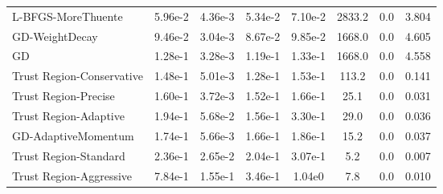 \documentclass{article}
\begin{document}
\begin{table}[htbp]
{\begin{tabular}{p{2.5cm}*{7}{c}}
L-BFGS-MoreThuente & 5.96e-2 & 4.36e-3 & 5.34e-2 & 7.10e-2 & 2833.2 & 0.0 & 3.804 \\
GD-WeightDecay & 9.46e-2 & 3.04e-3 & 8.67e-2 & 9.85e-2 & 1668.0 & 0.0 & 4.605 \\
GD & 1.28e-1 & 3.28e-3 & 1.19e-1 & 1.33e-1 & 1668.0 & 0.0 & 4.558 \\
Trust Region-Conservative & 1.48e-1 & 5.01e-3 & 1.28e-1 & 1.53e-1 & 113.2 & 0.0 & 0.141 \\
Trust Region-Precise & 1.60e-1 & 3.72e-3 & 1.52e-1 & 1.66e-1 & 25.1 & 0.0 & 0.031 \\
Trust Region-Adaptive & 1.94e-1 & 5.68e-2 & 1.56e-1 & 3.30e-1 & 29.0 & 0.0 & 0.036 \\
GD-AdaptiveMomentum & 1.74e-1 & 5.66e-3 & 1.66e-1 & 1.86e-1 & 15.2 & 0.0 & 0.037 \\
Trust Region-Standard & 2.36e-1 & 2.65e-2 & 2.04e-1 & 3.07e-1 & 5.2 & 0.0 & 0.007 \\
Trust Region-Aggressive & 7.84e-1 & 1.55e-1 & 3.46e-1 & 1.04e0 & 7.8 & 0.0 & 0.010 \\
\bottomrule
\end{tabular}
}
\end{table}
\end{document}
